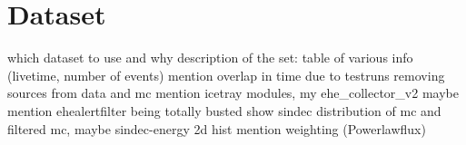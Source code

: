 \chapter{Dataset}
which dataset to use and why
description of the set: table of various info (livetime, number of events)
mention overlap in time due to testruns
removing sources from data and mc
mention icetray modules, my ehe\_collector\_v2 maybe
mention ehealertfilter being totally busted
show sindec distribution of mc and filtered mc, maybe sindec-energy 2d hist
mention weighting (Powerlawflux)
